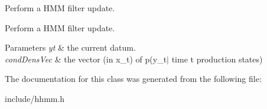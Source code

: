 Perform a H\+MM filter update. 

Perform a H\+MM filter update. 
\begin{DoxyParams}{Parameters}
{\em yt} & the current datum. \\
\hline
{\em cond\+Dens\+Vec} & the vector (in x\+\_\+t) of p(y\+\_\+t$\vert$ time t production states) \\
\hline
\end{DoxyParams}


The documentation for this class was generated from the following file\+:\begin{DoxyCompactItemize}
\item 
include/hhmm.\+h\end{DoxyCompactItemize}

